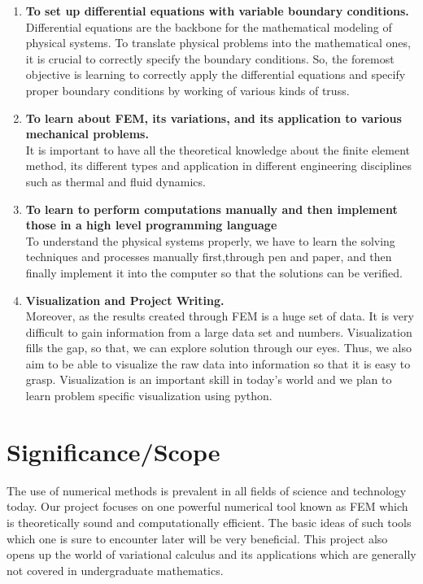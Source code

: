 \begin{enumerate}
 \item \textbf{To set up differential equations with variable boundary conditions.}\\
	Differential equations are the backbone for the mathematical modeling of physical systems. To translate physical problems into  the mathematical ones,  it is crucial to correctly specify the boundary conditions.  So, the foremost objective is learning to correctly apply the differential equations  and specify proper boundary conditions by working of various kinds of truss. 

 \item \textbf{To learn about FEM, its variations, and its application to various
 mechanical problems.}\\
 It is important to have all the theoretical knowledge about the finite element method, its different types and application in different engineering disciplines such as thermal and fluid dynamics.

 \item  \textbf{To learn to perform computations manually and then implement
 those in a high level programming language}\\
 To understand the physical systems properly, we have to learn the solving techniques and processes manually first,through pen and paper, and then finally implement it into the computer so that the solutions can be verified.


 \item \textbf{Visualization and Project Writing.}\\
Moreover, as the results created through FEM is a huge set of data. It is very difficult to gain information from a large data set and numbers. Visualization fills the gap, so that, we can explore solution through our eyes. Thus, we  also aim to be able to visualize the raw data into information so that it is easy to grasp. Visualization is an important skill in today's world and we plan to learn problem specific visualization using python.

\end{enumerate}



\section{\bf Significance/Scope}


The use of numerical methods is prevalent in all fields of science and technology today. Our project focuses on one powerful numerical tool known as FEM which is theoretically sound and computationally efficient. The basic ideas of such tools which one is sure to encounter later will be very beneficial. This project also opens up the world of variational calculus and its applications which are generally not covered in undergraduate mathematics.


